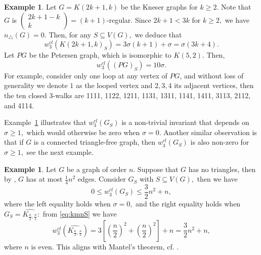 \documentclass[12pt,a4paper,reqno]{amsart}
\numberwithin{equation}{section}
\theoremstyle{plain}
\newtheorem{corollary}[theorem]{Corollary}
\theoremstyle{definition}
\newtheorem{remark}[theorem]{Remark}
\newtheorem{example}[theorem]{Example}
\newcommand{\<}{\langle}
\renewcommand{\>}{\rangle}
\begin{document}
\begin{example}
\label{expPetersen}
Let $G=K(2k+1,k)$ be the Kneser graphs for  $k \geq 2.$  Note that $G$ is $\begin{pmatrix} 2k+1-k \\ k \end{pmatrix} = (k+1)$-regular. Since $2k+1 < 3k$ for $k \geq 2,$ we have $n_\triangle(G)=0.$ Then, for any $S \subseteq V(G),$ we deduce that 
\[
w^{cl}_3(K(2k+1,k)_S)  = 3\sigma(k+1) + \sigma = \sigma(3k+4).
\]
Let $PG$ be the Petersen graph, which is isomorphic to $K(5,2).$ Then, 
\[
w^{cl}_3((PG)_S)=10\sigma.
\] For example, consider only one loop at any vertex of $PG$, and without loss of generality we denote $1$ as the looped vertex and $2,3,4$ its adjacent vertices, then the ten closed 3-walks are 1111, 1122, 1211, 1131, 1311, 1141, 1411, 3113, 2112, and 4114. 
\end{example}

Example~\ref{expPetersen} illustrates that $w_3^{cl}(G_S)$ is a non-trivial invariant that depends on $\sigma \geq 1,$ which would otherwise be zero when $\sigma=0.$   Another similar observation is that if $G$ is a connected triangle-free graph, then $w_{3}^{cl}(G_S)$ is also non-zero for $\sigma \geq 1,$ see the next example.    

\begin{example}
Let $G$ be a graph of order $n.$ Suppose that $G$ has no triangles, then by \cite[Theorem 2.3]{Harary1969}, $G$ has at most $\frac{1}{4} n^2$ edges. Consider $G_S$ with $S\subseteq V(G), $ %
then we have
\[
0 \leq w^{cl}_3(G_S) \leq \frac{3}{2} n^2 + n,
\]
where the left equality holds when $\sigma=0,$ and the right equality holds when $G_S=\widehat{K_{\frac{n}{2},\frac{n}{2}}}:$ from \eqref{eq:kmnS} we have
\[
w_3^{cl}(\widehat{K_{{\frac{n}{2},\frac{n}{2}}}})= 3\left[ \left(\frac{n}{2}\right)^2 + \left(\frac{n}{2}\right)^2 \right] + n = \frac{3}{2} n^2 +n,
\]
where $n$ is even.
This aligns with Mantel's theorem, cf. \cite[\S 20, Theorem 3]{Aigner2018}.
\end{example}
\end{document}
